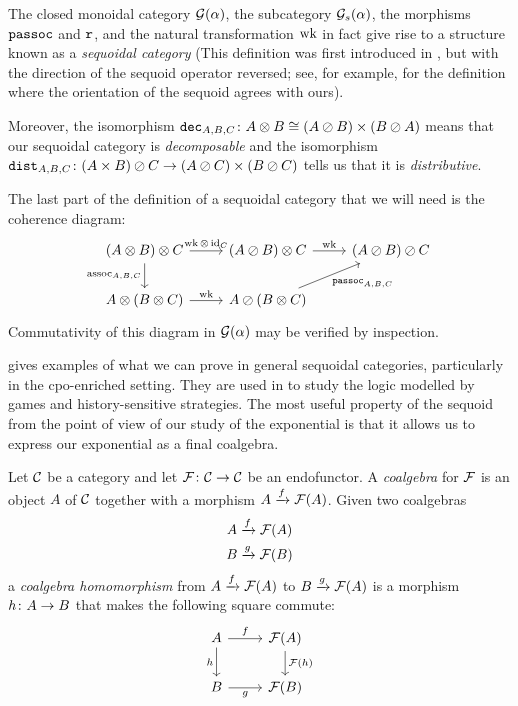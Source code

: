 \documentclass[11pt]{article} %
\begin{document}
The closed monoidal category $\G(\alpha)$, the subcategory $\G_s(\alpha)$, the morphisms $\passoc$ and $\run$, and the natural transformation $\wk$ in fact give rise to a structure known as a \emph{sequoidal category} (This definition was first introduced in \cite{laird02}, but with the direction of the sequoid operator reversed; see, for example, \cite{martinsthesis} for the definition where the orientation of the sequoid agrees with ours).  

Moreover, the isomorphism $\dec_{A,B,C}\from A\tensor B\cong (A\sequoid B)\times(B\sequoid A)$ means that our sequoidal category is \emph{decomposable} and the isomorphism $\dist_{A,B,C}\from (A\times B)\sequoid C\to (A\sequoid C)\times(B\sequoid C)$ tells us that it is \emph{distributive}.  

The last part of the definition of a sequoidal category that we will need is the coherence diagram:
\[
  \begin{tikzcd}
    (A \tensor B) \tensor C \arrow[r, "\wk\tensor\id_C"] \arrow[d, "\assoc_{A,B,C}"']
      & (A \sequoid B) \tensor C \arrow[r, "\wk"]
        & (A \sequoid B) \sequoid C \\
    A \tensor (B \tensor C) \arrow[r, "\wk"]
      & A \sequoid (B \tensor C) \arrow[ur, "\passoc_{A,B,C}"']
        &
  \end{tikzcd}
  \]
Commutativity of this diagram in $\G(\alpha)$ may be verified by inspection.  

\cite{laird02} gives examples of what we can prove in general sequoidal categories, particularly in the cpo-enriched setting.  They are used in \cite{martinsthesis} to study the logic modelled by games and history-sensitive strategies.  The most useful property of the sequoid from the point of view of our study of the exponential is that it allows us to express our exponential as a final coalgebra.

Let $\C$ be a category and let $\F\from \C\to\C$ be an endofunctor.  A \emph{coalgebra} for $\F$ is an object $A$ of $\C$ together with a morphism $\map{f}{A}{\F(A)}$.  Given two coalgebras
\begin{gather*}
  \map{f}{A}{\F(A)}\\
  \map{g}{B}{\F(B)}
\end{gather*}
a \emph{coalgebra homomorphism} from $\map{f}{A}{\F(A)}$ to $\map{g}{B}{\F(A)}$ is a morphism $\cmap{h}{A}{B}$ that makes the following square commute:
\[
  \begin{tikzcd}
    A \arrow[r, "f"] \arrow[d, "h"']
      & \F(A) \arrow[d, "\F(h)"] \\
    B \arrow[r, "g"']
      & \F(B)
  \end{tikzcd}
  \]
\end{document}

